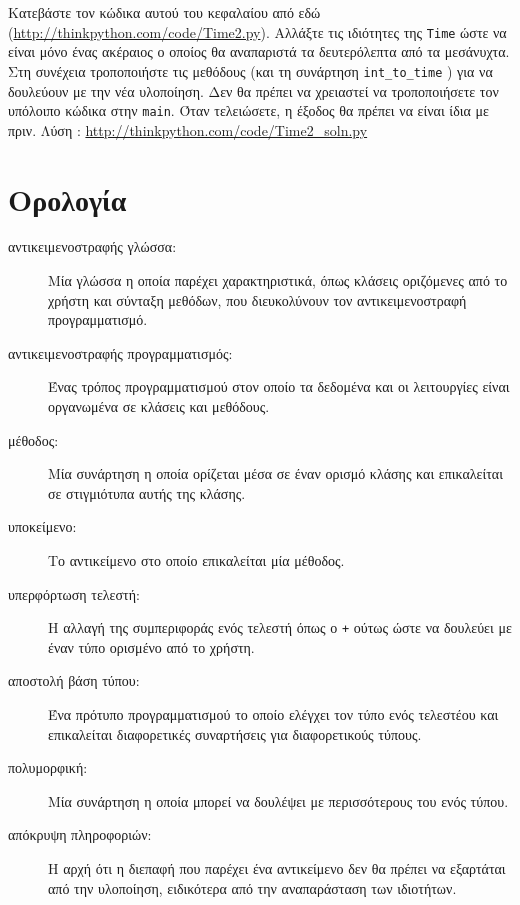 \documentclass[10pt]{book}
\begin{document}
\begin{exercise}

Κατεβάστε τον κώδικα αυτού του κεφαλαίου από εδώ  (\url{http://thinkpython.com/code/Time2.py}).   
Αλλάξτε τις ιδιότητες της  {\tt Time}  ώστε να είναι μόνο ένας ακέραιος ο οποίος θα αναπαριστά 
τα δευτερόλεπτα από τα μεσάνυχτα.  Στη συνέχεια τροποποιήστε τις μεθόδους (και τη συνάρτηση  \verb"int_to_time" ) 
για να δουλεύουν με την νέα υλοποίηση.  Δεν θα πρέπει να χρειαστεί να τροποποιήσετε τον υπόλοιπο κώδικα στην  {\tt main}. 
 Όταν τελειώσετε, η έξοδος θα πρέπει να είναι ίδια με πριν.  Λύση :
\url{http://thinkpython.com/code/Time2_soln.py}
\end{exercise}


 
\section{Ορολογία}

\begin{description}

\item[αντικειμενοστραφής γλώσσα:] Μία γλώσσα η οποία παρέχει χαρακτηριστικά, 
  όπως κλάσεις οριζόμενες από το χρήστη και σύνταξη μεθόδων, που διευκολύνουν τον 
  αντικειμενοστραφή προγραμματισμό.

\item[αντικειμενοστραφής προγραμματισμός:] Ένας τρόπος προγραμματισμού στον οποίο 
  τα δεδομένα και οι λειτουργίες είναι οργανωμένα σε κλάσεις και μεθόδους.

\item[μέθοδος:] Μία συνάρτηση η οποία ορίζεται μέσα σε έναν ορισμό κλάσης και επικαλείται 
  σε στιγμιότυπα αυτής της κλάσης.

\item[υποκείμενο:] Το αντικείμενο στο οποίο επικαλείται μία μέθοδος.

\item[υπερφόρτωση τελεστή:] Η αλλαγή της συμπεριφοράς ενός τελεστή όπως ο  {\tt +} 
   ούτως ώστε να δουλεύει με έναν τύπο ορισμένο από το χρήστη.

\item[αποστολή βάση τύπου:] Ένα πρότυπο προγραμματισμού το οποίο ελέγχει τον τύπο ενός 
  τελεστέου και επικαλείται διαφορετικές συναρτήσεις για διαφορετικούς τύπους.

\item[πολυμορφική:] Μία συνάρτηση η οποία μπορεί να δουλέψει με περισσότερους του ενός 
  τύπου.

\item[απόκρυψη πληροφοριών:] Η αρχή ότι η διεπαφή που παρέχει ένα αντικείμενο δεν θα 
  πρέπει να εξαρτάται από την υλοποίηση, ειδικότερα από την αναπαράσταση των ιδιοτήτων.


\end{description}
\end{document}
